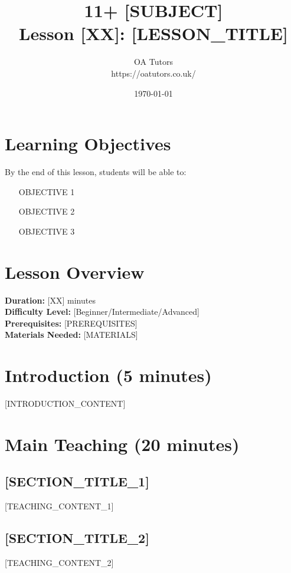 \documentclass[a4paper,12pt]{article}
\begin{document}
\title{\textcolor{oablue}{\Huge 11+ [SUBJECT]} \\ 
       \textcolor{oablue}{\Large Lesson [XX]: [LESSON_TITLE]}}
\author{\textcolor{oablue}{OA Tutors} \\ 
        \textcolor{oagray}{https://oatutors.co.uk/}}
\date{\textcolor{oagray}{\today}}

\maketitle

\section{Learning Objectives}
\begin{objective}
By the end of this lesson, students will be able to:
\begin{itemize}
    \item [OBJECTIVE 1]
    \item [OBJECTIVE 2] 
    \item [OBJECTIVE 3]
\end{itemize}
\end{objective}

\section{Lesson Overview}
\textbf{Duration:} [XX] minutes \\
\textbf{Difficulty Level:} [Beginner/Intermediate/Advanced] \\
\textbf{Prerequisites:} [PREREQUISITES] \\
\textbf{Materials Needed:} [MATERIALS]

\section{Introduction (5 minutes)}
[INTRODUCTION_CONTENT]

\section{Main Teaching (20 minutes)}
\subsection{[SECTION_TITLE_1]}
[TEACHING_CONTENT_1]

\subsection{[SECTION_TITLE_2]}
[TEACHING_CONTENT_2]
\end{document}
